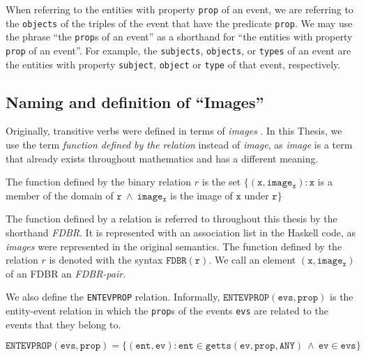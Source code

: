 \documentclass[../main.tex]{subfiles}
\begin{document}
When referring to the entities with property \texttt{prop} of an event, we are referring to the \texttt{objects} of the triples of the event that have the predicate \texttt{prop}.
We may use the phrase ``the \texttt{prop}s of an event'' as a shorthand for ``the entities with property \texttt{prop} of an event''.
For example, the \texttt{subjects}, \texttt{objects}, or \texttt{types} of an event are the entities with property \texttt{subject}, \texttt{object} or \texttt{type} of that event, respectively.

\subsection{Naming and definition of ``Images''}

Originally, transitive verbs were defined in terms of {\em images} \cite{frost2014denotational}.
In this Thesis, we use the term {\em function defined by the relation} instead of {\em image}, as {\em image} is a term that already exists throughout mathematics and has
a different meaning.

\begin{definition}
	The function defined by the binary relation $r$ is the set $\{(\mathtt{x}, \mathtt{image_x}) : \mathtt{x}$ is a member of the domain of $\mathtt{r} \ \wedge \  \mathtt{image_x}$ is the image of $\mathtt{x}$ under $\mathtt{r} \}$
\end{definition}

The function defined by a relation is referred to throughout this thesis by the shorthand {\em FDBR}.  It is represented with an association list in the Haskell code,
as {\em images} were represented in the original semantics.  The function defined by the relation $r$ is denoted with the syntax $\mathtt{FDBR}(\mathtt{r})$.
We call an element $\mathtt{(x, image_x)}$ of an FDBR an {\em FDBR-pair}.

We also define the \texttt{ENTEVPROP} relation.  Informally, $\mathtt{ENTEVPROP}(\mathtt{evs}, \mathtt{prop})$ is the entity-event relation in which the \texttt{prop}s of the events \texttt{evs} are related to the events that they belong to.

\begin{definition}
	\[\mathtt{ENTEVPROP}(\mathtt{evs}, \mathtt{prop}) = \{(\mathtt{ent}, \mathtt{ev}) : \mathtt{ent} \in \mathtt{getts}(\mathtt{ev}, \mathtt{prop}, \mathtt{ANY}) \ \wedge \ \mathtt{ev} \in \mathtt{evs} \}\]
\end{definition}
\end{document}
